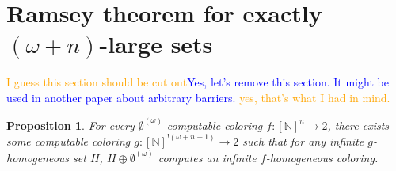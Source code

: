\documentclass{article}
\newcommand{\NN}[0]{\mathbb{N}}
\numberwithin{theorem}{section}
\newtheorem{proposition}[theorem]{Proposition}
\newcommand{\ludovic}[1]{\textcolor{blue}{#1}}
\newcommand{\lorenzo}[1]{\textcolor{orange}{#1}}
\begin{document}
\bigskip



\iffalse
\section{Ramsey theorem for exactly $(\omega + n)$-large sets}
\lorenzo{I guess this section should be cut out}\ludovic{Yes, let's remove this section. It might be used in another paper about arbitrary barriers.}
\lorenzo{yes, that's what I had in mind.}

\begin{proposition}
    For every $\emptyset^{(\omega)}$-computable coloring $f : [\NN]^n \to 2$, there exists some computable coloring $g : [\NN]^{!(\omega + n - 1)} \to 2$ such that for any infinite $g$-homogeneous set $H$, $H \oplus \emptyset^{(\omega)}$ computes an infinite $f$-homogeneous coloring. 
\end{proposition}
\end{document}
